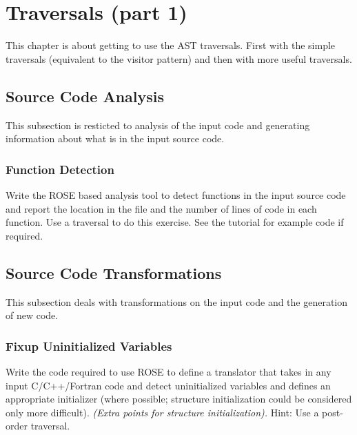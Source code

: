 \chapter{Traversals (part 1)}

  This chapter is about getting to use the AST traversals.
First with the simple traversals (equivalent to the visitor
pattern) and then with more useful traversals.

\section{Source Code Analysis}
   This subsection is resticted to analysis of the input code
and generating information about what is in the input source code.

\subsection{Function Detection}
   Write the ROSE based analysis tool to detect functions in the input source code
and report the location in the file and the number of lines of code in each function.
Use a traversal to do this exercise. See the tutorial for example code if required.

\section{Source Code Transformations}
   This subsection deals with transformations on the 
input code and the generation of new code.

\subsection{Fixup Uninitialized Variables}
   Write the code required to use ROSE to define a translator
that takes in any input C/C++/Fortran code and detect uninitialized
variables and defines an appropriate initializer (where possible;
structure initialization could be considered only more difficult).
{\em (Extra points for structure initialization).}
Hint: Use a post-order traversal.




